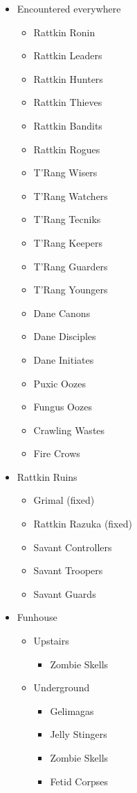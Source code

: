 \documentclass[12pt]{article}
\providecommand{\tightlist}{%
  \setlength{\itemsep}{0pt}\setlength{\parskip}{0pt}}
\begin{document}
\begin{multicols}{2}
  \begin{itemize}
  \item Encountered everywhere
    \begin{itemize}
      \tightlist
    \item Rattkin Ronin
    \item Rattkin Leaders
    \item Rattkin Hunters
    \item Rattkin Thieves
    \item Rattkin Bandits
    \item Rattkin Rogues
    \item T'Rang Wisers
    \item T'Rang Watchers
    \item T'Rang Tecniks
    \item T'Rang Keepers
    \item T'Rang Guarders
    \item T'Rang Youngers
    \item Dane Canons
    \item Dane Disciples
    \item Dane Initiates
    \item Puxic Oozes
    \item Fungus Oozes
    \item Crawling Wastes
    \item Fire Crows
    \end{itemize}

  \item Rattkin Ruins
    \begin{itemize}
      \tightlist
    \item Grimal (fixed)
    \item Rattkin Razuka (fixed)
    \item Savant Controllers
    \item Savant Troopers
    \item Savant Guards
    \end{itemize}

  \item Funhouse
    \begin{itemize}
      \tightlist
    \item Upstairs
      \begin{itemize}
        \tightlist
      \item Zombie Skells
      \end{itemize}

      \item Underground
        \begin{itemize}
          \tightlist
        \item Gelimagas
        \item Jelly Stingers
        \item Zombie Skells
        \item Fetid Corpses
        \end{itemize}
    \end{itemize}
  \end{itemize}
\end{multicols}
\end{document}
